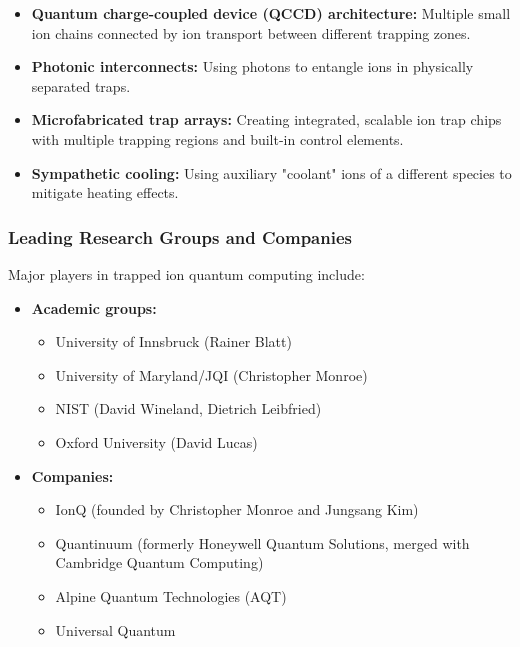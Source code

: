 \begin{itemize}
  \item \textbf{Quantum charge-coupled device (QCCD) architecture:} Multiple
    small ion chains connected by ion transport between different trapping
    zones.

  \item \textbf{Photonic interconnects:} Using photons to entangle ions in
    physically separated traps.

  \item \textbf{Microfabricated trap arrays:} Creating integrated, scalable
    ion trap chips with multiple trapping regions and built-in control
    elements.

  \item \textbf{Sympathetic cooling:} Using auxiliary "coolant" ions of a
    different species to mitigate heating effects.
\end{itemize}

\subsubsection*{Leading Research Groups and Companies}

Major players in trapped ion quantum computing include:

\begin{itemize}
  \item \textbf{Academic groups:}
    \begin{itemize}
      \item University of Innsbruck (Rainer Blatt)
      \item University of Maryland/JQI (Christopher Monroe)
      \item NIST (David Wineland, Dietrich Leibfried)
      \item Oxford University (David Lucas)
    \end{itemize}

  \item \textbf{Companies:}
    \begin{itemize}
      \item IonQ (founded by Christopher Monroe and Jungsang Kim)
      \item Quantinuum (formerly Honeywell Quantum Solutions, merged with
        Cambridge Quantum Computing)
      \item Alpine Quantum Technologies (AQT)
      \item Universal Quantum
    \end{itemize}
\end{itemize}

